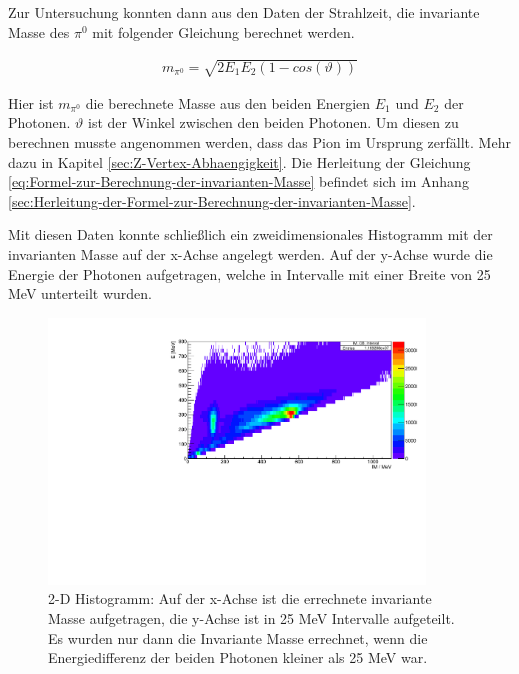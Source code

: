 \documentclass[a4paper,11pt,oneside,final,german,openbib,pdftex]{scrbook}
\begin{document}
{Zur Untersuchung konnten dann aus den Daten der Strahlzeit, die invariante Masse des $\pi^0$ mit folgender Gleichung berechnet werden.

 \begin{equation}
 \begin{split}
 {m_{\pi^0}=\sqrt{2E_1E_2(1-cos(\vartheta))}}
 \label{eq:Formel-zur-Berechnung-der-invarianten-Masse}
 \end{split}
 \end{equation}

Hier ist $m_{\pi^0}$ die berechnete Masse aus den beiden Energien $E_1$ und $E_2$ der Photonen. $\vartheta$ ist der Winkel zwischen den beiden Photonen. Um diesen zu berechnen musste angenommen werden, dass das Pion im Ursprung zerf\"allt. Mehr dazu in Kapitel \ref{sec:Z-Vertex-Abhaengigkeit}.
Die Herleitung der Gleichung \ref{eq:Formel-zur-Berechnung-der-invarianten-Masse} befindet sich im Anhang \ref{sec:Herleitung-der-Formel-zur-Berechnung-der-invarianten-Masse}.

Mit diesen Daten konnte schließlich ein zweidimensionales Histogramm mit der invarianten Masse auf der x-Achse angelegt werden. Auf der y-Achse wurde die Energie der Photonen aufgetragen, welche in Intervalle mit einer Breite von 25 MeV unterteilt wurden. 


\begin{figure}[h!]
	\begin{center}
		\includegraphics[width=100mm]{20172803IM_CB_Symmetric}
	
		\caption{2-D Histogramm: Auf der x-Achse ist die errechnete invariante Masse aufgetragen, die y-Achse ist in 25 MeV Intervalle aufgeteilt. Es wurden nur dann die Invariante Masse errechnet, wenn die Energiedifferenz der beiden Photonen kleiner als 25 MeV war.}
			\label{fig:Energy-Interval-Hist-All-Bins}
	\end{center}
\end{figure}

}
\end{document}
